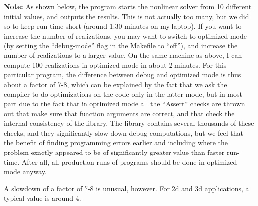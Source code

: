 \documentclass{article}
\begin{document}
\textbf{Note:} As shown below, the program starts the nonlinear solver from 10 different
initial values, and outputs the results. This is not actually too many, but we
did so to keep run-time short (around 1:30 minutes on my laptop). If you want to
increase the number of realizations, you may want to switch to optimized mode
(by setting the ``debug-mode'' flag in the Makefile to ``off''), and increase
the number of realizations to a larger value. On the same machine as above, I
can compute 100 realizations in optimized mode in about 2 minutes. For
this particular program, the difference between debug and optimized mode is
thus about a factor of 7-8, which can be explained by the fact that we ask the
compiler to do optimizations on the code only in the latter mode, but in most
part due to the fact that in optimized mode all the ``Assert'' checks are
thrown out that make sure that function arguments are correct, and that check
the internal consistency of the library. The library contains several
thousands of these checks, and they significantly slow down debug
computations, but we feel that the benefit of finding programming errors
earlier and including where the problem exactly appeared to be of significantly
greater value than faster run-time. After all, all production runs of programs
should be done in optimized mode anyway.

A slowdown of a factor of 7-8 is unusual, however. For 2d and 3d applications,
a typical value is around 4. 
\end{document}
